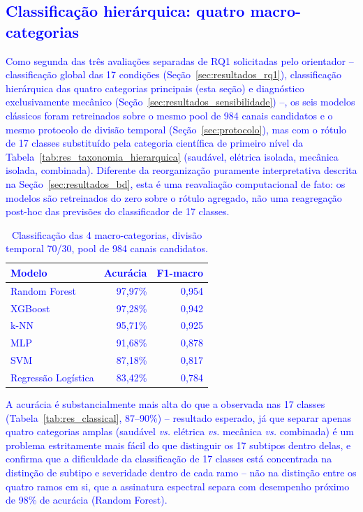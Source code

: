 \documentclass[times,final]{elsarticle}
\begin{document}
\textcolor{blue}{
\subsection{Classificação hierárquica: quatro macro-categorias}
\label{sec:resultados_macro}
Como segunda das três avaliações separadas de RQ1 solicitadas pelo orientador -- classificação global das 17 condições (Seção~\ref{sec:resultados_rq1}), classificação hierárquica das quatro categorias principais (esta seção) e diagnóstico exclusivamente mecânico (Seção~\ref{sec:resultados_sensibilidade}) --, os seis modelos clássicos foram retreinados sobre o mesmo pool de 984 canais candidatos e o mesmo protocolo de divisão temporal (Seção~\ref{sec:protocolo}), mas com o rótulo de 17 classes substituído pela categoria científica de primeiro nível da Tabela~\ref{tab:res_taxonomia_hierarquica} (saudável, elétrica isolada, mecânica isolada, combinada). Diferente da reorganização puramente interpretativa descrita na Seção~\ref{sec:resultados_bd}, esta é uma reavaliação computacional de fato: os modelos são retreinados do zero sobre o rótulo agregado, não uma reagregação post-hoc das previsões do classificador de 17 classes.

\begin{table}[H]
    \centering
    \caption{Classificação das 4 macro-categorias, divisão temporal 70/30, pool de 984 canais candidatos.}
    \label{tab:res_macro}
    \begin{tabular}{@{}lrr@{}}
        \toprule
        \textbf{Modelo} & \textbf{Acurácia} & \textbf{F1-macro} \\
        \midrule
        Random Forest & 97,97\% & 0,954 \\
        XGBoost & 97,28\% & 0,942 \\
        k-NN & 95,71\% & 0,925 \\
        MLP & 91,68\% & 0,878 \\
        SVM & 87,18\% & 0,817 \\
        Regressão Logística & 83,42\% & 0,784 \\
        \bottomrule
    \end{tabular}
\end{table}

A acurácia é substancialmente mais alta do que a observada nas 17 classes (Tabela~\ref{tab:res_classical}, 87--90\%) -- resultado esperado, já que separar apenas quatro categorias amplas (saudável \textit{vs.} elétrica \textit{vs.} mecânica \textit{vs.} combinada) é um problema estritamente mais fácil do que distinguir os 17 subtipos dentro delas, e confirma que a dificuldade da classificação de 17 classes está concentrada na distinção de subtipo e severidade dentro de cada ramo -- não na distinção entre os quatro ramos em si, que a assinatura espectral separa com desempenho próximo de 98\% de acurácia (Random Forest).

}
\end{document}
